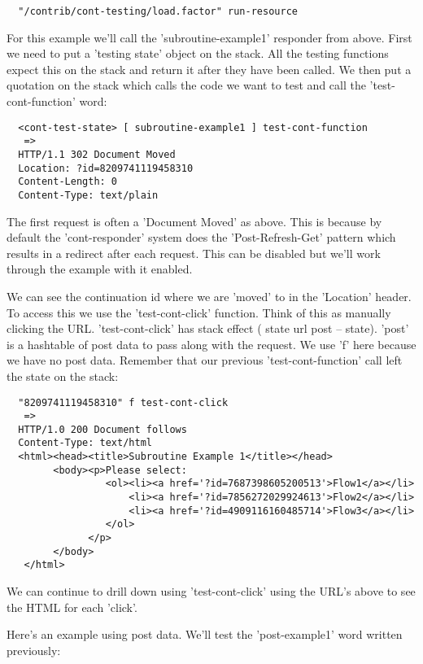 \begin{verbatim}
  "/contrib/cont-testing/load.factor" run-resource
\end{verbatim}

For this example we'll call the 'subroutine-example1' responder from
above. First we need to put a 'testing state' object on the stack. All
the testing functions expect this on the stack and return it after
they have been called. We then put a quotation on the stack which
calls the code we want to test and call the 'test-cont-function' word:

\begin{verbatim}
  <cont-test-state> [ subroutine-example1 ] test-cont-function
   => 
  HTTP/1.1 302 Document Moved
  Location: ?id=8209741119458310
  Content-Length: 0
  Content-Type: text/plain
\end{verbatim}

The first request is often a 'Document Moved' as above. This is
because by default the 'cont-responder' system does the
'Post-Refresh-Get' pattern which results in a redirect after each
request. This can be disabled but we'll work through the example with
it enabled.

We can see the continuation id where we are 'moved' to in the
'Location' header. To access this we use the 'test-cont-click'
function. Think of this as manually clicking the
URL. 'test-cont-click' has stack effect 
( state url post -- state). 'post' is a hashtable of post data to pass 
along with the request. We use 'f' here because we have no post
data. Remember that our previous 'test-cont-function' call left the
state on the stack:

\begin{verbatim}
  "8209741119458310" f test-cont-click
   =>
  HTTP/1.0 200 Document follows
  Content-Type: text/html
  <html><head><title>Subroutine Example 1</title></head>
        <body><p>Please select:
                 <ol><li><a href='?id=7687398605200513'>Flow1</a></li>
                     <li><a href='?id=7856272029924613'>Flow2</a></li>
                     <li><a href='?id=4909116160485714'>Flow3</a></li>
                 </ol>
              </p>
        </body>
   </html>
\end{verbatim}

We can continue to drill down using 'test-cont-click' using the URL's
above to see the HTML for each 'click'.

Here's an example using post data. We'll test the 'post-example1' word
written previously:

